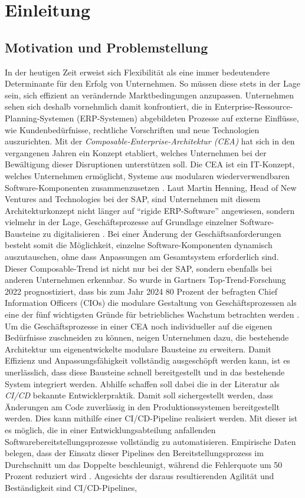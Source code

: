 \section{Einleitung}

\subsection{Motivation und Problemstellung}
In der heutigen Zeit erweist sich Flexibilität als eine immer bedeutendere Determinante für den Erfolg von Unternehmen. So müssen diese stets in der Lage sein, sich effizient an verändernde Marktbedingungen anzupassen. Unternehmen sehen sich deshalb vornehmlich damit konfrontiert, die in Enterprise-Ressource-Planning-Systemen (\acs{ERP}-Systemen) abgebildeten Prozesse auf externe Einflüsse, wie Kundenbedürfnisse, rechtliche Vorschriften und neue Technologien auszurichten. Mit der \textit{Composable-Enterprise-Architektur (CEA)} hat sich in den vergangenen Jahren ein Konzept etabliert, welches Unternehmen bei der Bewältigung dieser Disruptionen unterstützen soll. Die CEA ist ein IT-Konzept, welches Unternehmen ermöglicht, Systeme aus modularen wiederverwendbaren Software-Kompo\-nenten zusammenzusetzen \cite{.20230313}. Laut Martin Henning, Head of New Ventures and Technologies bei der SAP, sind Unternehmen mit diesem Architekturkonzept nicht länger auf \enquote{rigide ERP-Software} angewiesen, sondern vielmehr in der Lage, Geschäftsprozesse auf Grundlage einzelner Software-Bausteine zu digitalisieren \cite{Galer.20221019}. Bei einer Änderung der Geschäftsanforderungen besteht somit die Möglichkeit, einzelne Software-Kompo\-nenten dynamisch auszutauschen, ohne dass Anpassungen am Gesamtsystem erforderlich sind. Dieser Composable-Trend ist nicht nur bei der SAP, sondern ebenfalls bei anderen Unternehmen erkennbar. So wurde in Gartners Top-Trend-Forschung 2022 prognostiziert, dass bis zum Jahr 2024 80 Prozent der befragten Chief Information Officers (\acs{CIO}s) die modulare Gestaltung von Geschäftsprozessen als eine der fünf wichtigsten Gründe für betriebliches Wachstum betrachten werden \cite{Gartner.20230408}. Um die Geschäftsprozesse in einer CEA noch individueller auf die eigenen Bedürfnisse zuschneiden zu können, neigen Unternehmen dazu, die bestehende Architektur um eigenentwickelte modulare Bausteine zu erweitern. Damit Effizienz und Anpassungs\-fähigkeit vollständig ausgeschöpft werden kann, ist es unerlässlich, dass diese Bausteine schnell bereitgestellt und in das bestehende System integriert werden. Abhilfe schaffen soll dabei die in der Literatur als \textit{\ac{CI/CD}} bekannte Entwicklerpraktik. Damit soll sichergestellt werden, dass Änderungen am Code zuverlässig in den Produktionssystemen bereitgestellt werden. Dies kann mithilfe einer CI/CD-Pipeline realisiert werden. Mit dieser ist es möglich, die in einer Entwicklungsabteilung anfallenden Softwarebereitstellungsprozesse vollständig zu automatisieren. Empirische Daten belegen, dass der Einsatz dieser Pipelines den Bereitstellungsprozess im Durchschnitt um das Doppelte beschleunigt, während die Fehlerquote um 50 Prozent reduziert wird \cite{abdalslam.20230128}. Angesichts der daraus resultierenden Agilität und Beständigkeit sind CI/CD-Pipelines, 